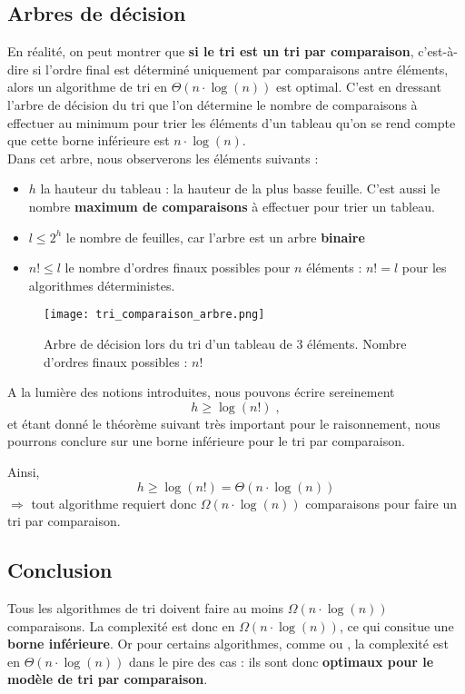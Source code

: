 \documentclass[12pt,a4paper]{book}
\newcommand{\pseudo}[1]{\rouge{\textsc{#1}}}
\begin{document}
\subsection{Arbres de décision}
En réalité, on peut montrer que \textbf{si le tri est un tri par comparaison}, c'est-à-dire si l'ordre final est déterminé uniquement par comparaisons antre éléments, alors un algorithme de tri en $\Theta(n\cdot\log(n))$ est optimal. C'est en dressant l'arbre de décision du tri que l'on détermine le nombre de comparaisons à effectuer au minimum pour trier les éléments d'un tableau qu'on se rend compte que cette borne inférieure est $n\cdot \log(n)$. \\

Dans cet arbre, nous observerons les éléments suivants :
\begin{itemize}
\item $h$ la hauteur du tableau : la hauteur de la plus basse feuille. C'est aussi le nombre \textbf{maximum de comparaisons} à effectuer pour trier un tableau.
\item $l \leq 2^h$ le nombre de feuilles, car l'arbre est un arbre \textbf{binaire}
\item $n! \leq l$ le nombre d'ordres finaux possibles pour $n$ éléments : $n! = l$ pour les algorithmes déterministes.
\end{itemize}
\begin{figure}[h]
\texttt{[image: tri\_comparaison\_arbre.png]}
\caption{Arbre de décision lors du tri d'un tableau de 3 éléments. Nombre d'ordres finaux possibles : $n!$}
\end{figure}
A la lumière des notions introduites, nous pouvons écrire sereinement $$h \geq \log(n!) \; ,$$ et étant donné le théorème suivant très important pour le raisonnement, nous pourrons conclure sur une borne inférieure pour le tri par comparaison.

Ainsi, $$h \geq \log(n!) = \Theta(n\cdot\log(n))$$ $\Rightarrow$ tout algorithme requiert donc $\Omega(n\cdot\log(n))$ comparaisons pour faire un tri par comparaison.
\subsection{Conclusion}
Tous les algorithmes de tri doivent faire au moins $\Omega(n\cdot\log(n))$ comparaisons. La complexité est donc en $\Omega(n\cdot\log(n))$, ce qui consitue une \textbf{borne inférieure}. Or pour certains algorithmes, comme \pseudo{Mergesort} ou \pseudo{Heapsort}, la complexité est en $\Theta(n\cdot\log(n))$ dans le pire des cas : ils sont donc \textbf{optimaux pour le modèle de tri par comparaison}.
\end{document}

